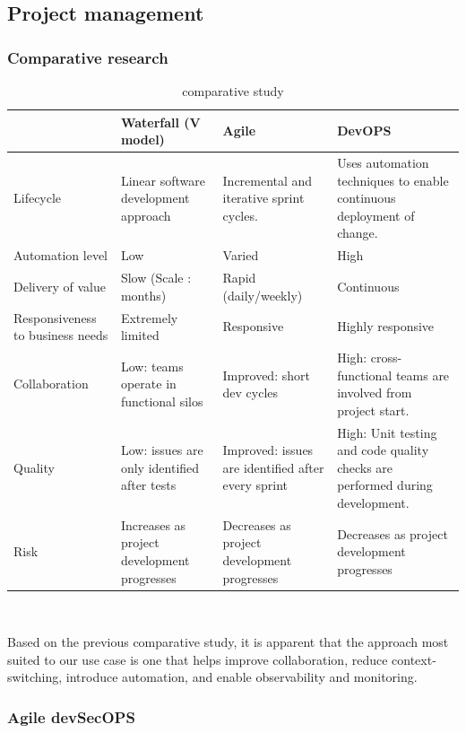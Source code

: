 \subsection{Project management }
\subsubsection{Comparative research }

\begin{table}[h!]
\center
\begin{tabular}[b]{|m{3cm}|m{4cm}|m{4cm}|m{4cm}|}
\hline
\rowcolor{white}
 & Waterfall (V model) 
 & Agile   & DevOPS  \\
\hline
 Lifecycle  
& Linear software development approach 
& Incremental and iterative sprint cycles. 
& Uses automation techniques to enable continuous deployment of change. \\
\hline
 Automation level  
& Low 
& Varied 
& High 
 \\
\hline
 Delivery of value 
& Slow (Scale : months) 
& Rapid (daily/weekly) 
& Continuous  \\
\hline
 Responsiveness to business needs 
& Extremely limited 
& Responsive 
& Highly responsive   \\
\hline
 Collaboration 
& Low: teams operate in functional silos 
& Improved: short dev cycles 
& High: cross-functional teams are involved from project start. \\
\hline
Quality 
& Low: issues are only identified after tests 
& Improved: issues are identified after every sprint 
& High: Unit testing and code quality checks are performed during development. \\
\hline
 Risk 
& Increases as project development progresses 
& Decreases as project development progresses 
& Decreases as project development progresses \\
\hline
\end{tabular}
\caption{ comparative study}
\textcolor{white}{I} \label{tab:tab-m}
\end{table}

Based on the previous comparative study, it is apparent that the approach most suited to our use case is one that helps improve collaboration, reduce context-switching, introduce automation, and enable observability and monitoring. 

\subsubsection{Agile devSecOPS }

